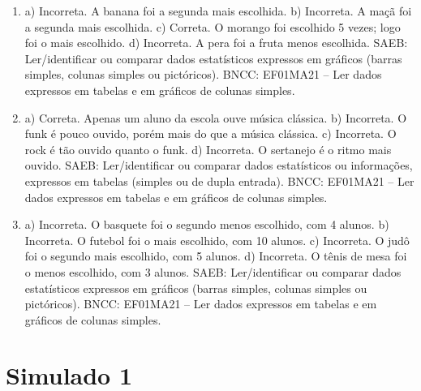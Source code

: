 \begin{enumerate}
\item
a) Incorreta. A banana foi a segunda mais escolhida.
b) Incorreta. A maçã foi a segunda mais escolhida.
c) Correta. O morango foi escolhido 5 vezes; logo foi o mais escolhido.
d) Incorreta. A pera foi a fruta menos escolhida.
SAEB: Ler/identificar ou comparar dados estatísticos expressos
em gráficos (barras simples, colunas simples ou pictóricos).
BNCC: EF01MA21 -- Ler dados expressos em tabelas e em gráficos de colunas
simples.

\item
a) Correta. Apenas um aluno da escola ouve música clássica.
b) Incorreta. O funk é pouco ouvido, porém mais do que a música clássica.
c) Incorreta. O rock é tão ouvido quanto o funk.
d) Incorreta. O sertanejo é o ritmo mais ouvido.
SAEB: Ler/identificar ou comparar dados estatísticos ou informações, expressos
em tabelas (simples ou de dupla entrada).
BNCC: EF01MA21 -- Ler dados expressos em tabelas e em gráficos de colunas
simples.

\item
a) Incorreta. O basquete foi o segundo menos escolhido, com 4 alunos.
b) Incorreta. O futebol foi o mais escolhido, com 10 alunos.
c) Incorreta. O judô foi o segundo mais escolhido, com 5 alunos.
d) Incorreta. O tênis de mesa foi o menos escolhido, com 3 alunos.
SAEB:
Ler/identificar ou comparar dados estatísticos expressos em gráficos
(barras simples, colunas simples ou pictóricos).
BNCC: EF01MA21 -- Ler dados expressos em tabelas e em gráficos de colunas
simples.
\end{enumerate}

\section*{Simulado 1}

